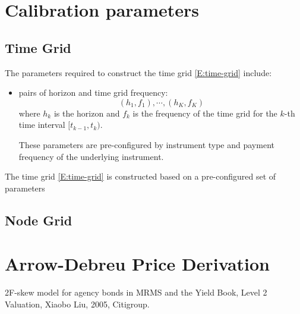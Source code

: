 \documentclass{texyise}
\begin{document}
\section{Calibration parameters}

\subsection{Time Grid}
\label{S:time-grid}

The parameters required to construct the time grid \eqref{E:time-grid} include:
\begin{itemize}
    \item pairs of horizon and time grid frequency:
    \begin{equation}
        (h_1, f_1), \cdots, (h_K, f_K)
    \end{equation}
    where $h_k$ is the horizon and $f_k$ is the frequency of the time grid for the $k$-th time interval $[t_{k-1}, t_k)$.

    These parameters are pre-configured by instrument type and payment frequency of the underlying instrument. 



\end{itemize}


The time grid \eqref{E:time-grid} is constructed based on a pre-configured set of parameters



\subsection{Node Grid}
\label{S:node-grid}

\appendix

\section{Arrow-Debreu Price Derivation}
\label{S:arrow-debreu}

\begin{thebibliography}{}
    
     2F-skew model for agency bonds in MRMS and the Yield Book, Level 2 Valuation, Xiaobo Liu, 2005, Citigroup.

\end{thebibliography}
\end{document}

